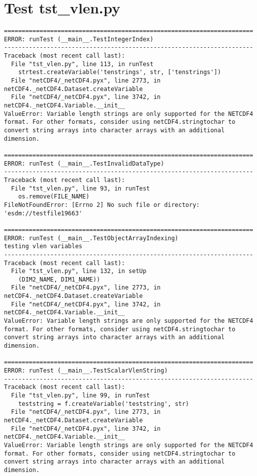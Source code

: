 \section{Test tst\_vlen.py}

\begin{verbatim}
======================================================================
ERROR: runTest (__main__.TestIntegerIndex)
----------------------------------------------------------------------
Traceback (most recent call last):
  File "tst_vlen.py", line 113, in runTest
    strtest.createVariable('tenstrings', str, ['tenstrings'])
  File "netCDF4/_netCDF4.pyx", line 2773, in netCDF4._netCDF4.Dataset.createVariable
  File "netCDF4/_netCDF4.pyx", line 3742, in netCDF4._netCDF4.Variable.__init__
ValueError: Variable length strings are only supported for the NETCDF4 format. For other formats, consider using netCDF4.stringtochar to convert string arrays into character arrays with an additional dimension.

======================================================================
ERROR: runTest (__main__.TestInvalidDataType)
----------------------------------------------------------------------
Traceback (most recent call last):
  File "tst_vlen.py", line 93, in runTest
    os.remove(FILE_NAME)
FileNotFoundError: [Errno 2] No such file or directory: 'esdm://testfile19663'

======================================================================
ERROR: runTest (__main__.TestObjectArrayIndexing)
testing vlen variables
----------------------------------------------------------------------
Traceback (most recent call last):
  File "tst_vlen.py", line 132, in setUp
    (DIM2_NAME, DIM1_NAME))
  File "netCDF4/_netCDF4.pyx", line 2773, in netCDF4._netCDF4.Dataset.createVariable
  File "netCDF4/_netCDF4.pyx", line 3742, in netCDF4._netCDF4.Variable.__init__
ValueError: Variable length strings are only supported for the NETCDF4 format. For other formats, consider using netCDF4.stringtochar to convert string arrays into character arrays with an additional dimension.

======================================================================
ERROR: runTest (__main__.TestScalarVlenString)
----------------------------------------------------------------------
Traceback (most recent call last):
  File "tst_vlen.py", line 99, in runTest
    teststring = f.createVariable('teststring', str)
  File "netCDF4/_netCDF4.pyx", line 2773, in netCDF4._netCDF4.Dataset.createVariable
  File "netCDF4/_netCDF4.pyx", line 3742, in netCDF4._netCDF4.Variable.__init__
ValueError: Variable length strings are only supported for the NETCDF4 format. For other formats, consider using netCDF4.stringtochar to convert string arrays into character arrays with an additional dimension.


\end{verbatim}
